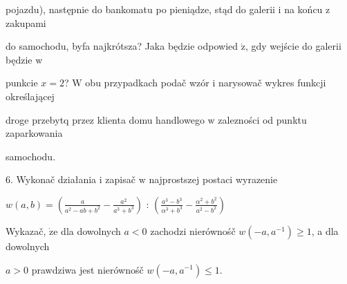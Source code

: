\documentclass[a4paper,12pt]{article}
\begin{document}
pojazdu), następnie do bankomatu po pieniądze, stąd do galerii $\mathrm{i}$ na końcu $\mathrm{z}$ zakupami

do samochodu, byfa najkrótsza? Jaka będzie odpowied $\acute{\mathrm{z}}$, gdy wejście do galerii będzie $\mathrm{w}$

punkcie $x=2$? $\mathrm{W}$ obu przypadkach podač wzór $\mathrm{i}$ narysowač wykres funkcji określającej

droge przebytq przez klienta domu handlowego $\mathrm{w}$ zalezności od punktu zaparkowania

samochodu.

6. Wykonač działania $\mathrm{i}$ zapisač $\mathrm{w}$ najprostszej postaci wyrazenie

$w(a,b)= (\displaystyle \frac{a}{a^{2}-ab+b^{2}}-\frac{a^{2}}{a^{3}+b^{3}})$ : $(\displaystyle \frac{a^{3}-b^{3}}{\alpha^{3}+b^{3}}-\frac{\alpha^{2}+b^{2}}{a^{2}-b^{2}})$

Wykazač, $\dot{\mathrm{z}}\mathrm{e}$ dla dowolnych $a<0$ zachodzi nierównośč $w(-a,a^{-1})\geq 1$, a dla dowolnych

$a>0$ prawdziwa jest nierównośč $w(-a,a^{-1})\leq 1.$
\end{document}
